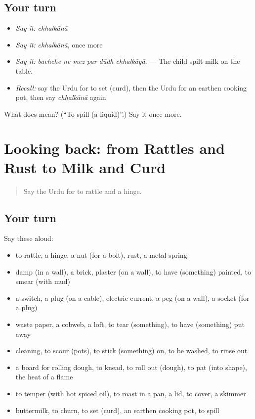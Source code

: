 \subsection*{Your turn}
\begin{itemize}
\raggedright
  \item \emph{Say it:} \emph{chhalkānā}
  \item \emph{Say it:} \emph{chhalkānā}, once more
  \item \emph{Say it:} \emph{bachche ne mez par dūdh chhalkāyā.} — The child spilt milk on the table.
  \item \emph{Recall:} say the Urdu for to set (curd), then the Urdu for an earthen cooking pot, then say \emph{chhalkānā} again
\end{itemize}

\begin{tcolorbox}[breakable,colback=teal!4,colframe=teal!35!black,title={Before you move on}]
What does  mean? (\textquotedblleft{}To spill (a liquid)\textquotedblright{}.) Say it once more.
\end{tcolorbox}
\section[(dialogue)]{Looking back: from Rattles and Rust to Milk and Curd}

\label{lesson:UR-R509-review-502-509}



\begin{quote}
Say the Urdu for to rattle and a hinge.
\end{quote}

\subsection*{Your turn}
Say these aloud:

\begin{itemize}
\raggedright
  \item to rattle, a hinge, a nut (for a bolt), rust, a metal spring
  \item damp (in a wall), a brick, plaster (on a wall), to have (something) painted, to smear (with mud)
  \item a switch, a plug (on a cable), electric current, a peg (on a wall), a socket (for a plug)
  \item waste paper, a cobweb, a loft, to tear (something), to have (something) put away
  \item cleaning, to scour (pots), to stick (something) on, to be washed, to rinse out
  \item a board for rolling dough, to knead, to roll out (dough), to pat (into shape), the heat of a flame
  \item to temper (with hot spiced oil), to roast in a pan, a lid, to cover, a skimmer
  \item buttermilk, to churn, to set (curd), an earthen cooking pot, to spill
\end{itemize}

